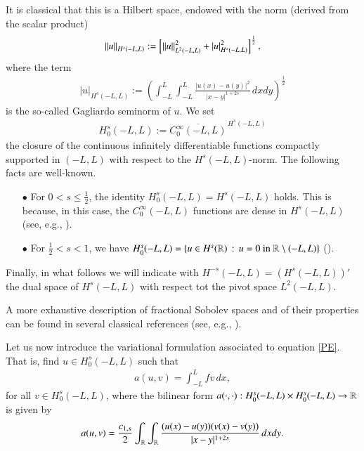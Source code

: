 It is classical that this is a Hilbert space, endowed with the norm (derived from the scalar product)
\begin{align*}
	{\left\|u\right\|}_{H^s(-L,L)} := \left[{\left\|u\right\|}_{L^2(-L,L)}^2 + |u|_{H^s(-L,L)}^2\right]^{\frac 12},
\end{align*}
where the term 
\begin{align*}
|u|_{H^s(-L,L)}:= \left(\int_{-L}^L\int_{-L}^L \frac{|u(x)-u(y)|^2}{|x-y|^{1+2s}}\,dxdy\right)^{\frac 12}
\end{align*}
is the so-called Gagliardo seminorm of $u$. We set 
\begin{align*}
H_0^s(-L,L):= \overline{C_0^\infty(-L,L)}^{\,H^s(-L,L)}
\end{align*}
the closure of the continuous infinitely differentiable functions compactly supported in $(-L,L)$ with respect to the $H^s(-L,L)$-norm. The following facts are well-known.
\begin{itemize}
	\item[$\bullet$] For $0<s\leq\frac 12$, the identity $H_0^s(-L,L) = H^s(-L,L)$ holds. This is because, in this case, the $C_0^\infty(-L,L)$ functions are dense in $H^s(-L,L)$ (see, e.g., \cite[Theorem 11.1]{jllions1972non}).
	
	\item[$\bullet$] For $\frac 12<s<1$, we have $H_0^s(-L,L)=\left\{ u\in H^s(\mathbb{R})\,:\,u=0\textrm{ in } \mathbb{R}\setminus (-L,L)\right\}$ (\cite{fiscella2015density}).
\end{itemize}

Finally, in what follows we will indicate with $H^{-s}(-L,L)=\left(H^s(-L,L)\right)'$ the dual space of $H^s(-L,L)$ with respect tot the pivot space $L^2(-L,L)$.

A more exhaustive description of fractional Sobolev spaces and of their properties can be found in several classical references (see, e.g., \cite{adams2003sobolev,dihitchhiker,jllions1972non}).

Let us now introduce the variational formulation associated to equation \eqref{PE}. That is, find $u\in H^s_0(-L,L)$ such that
\begin{align*}
a(u,v) = \int_{-L}^L fv\,dx,	
\end{align*}
for all $v\in H_0^s(-L,L)$, where the bilinear form $a(\cdot,\cdot):H^s_0(-L,L)\times H^s_0(-L,L)\to \mathbb{R}$ is given by
\begin{align*}
a(u,v)=\frac{c_{1,s}}{2} \int_{\mathbb{R}}\int_{\mathbb{R}}\frac{(u(x)-u(y))(v(x)-v(y))}{|x-y|^{1+2s}}\,dxdy.	
\end{align*}

